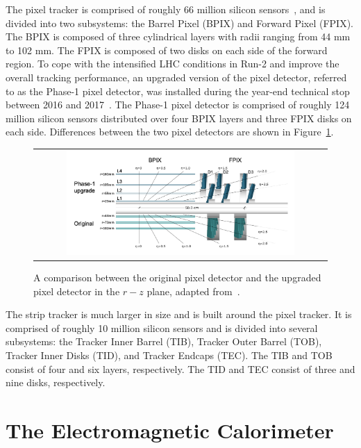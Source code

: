 The pixel tracker is comprised of roughly 66 million silicon sensors~\cite{CMS:2014pgm}, and is divided into two subsystems: the Barrel Pixel (BPIX) and  Forward Pixel (FPIX). The BPIX is composed of three cylindrical layers with radii ranging from 44 mm to 102 mm. The FPIX is composed of two disks on each side of the forward region. To cope with the intensified \ac{LHC} conditions in Run-2 and improve the overall tracking performance, an upgraded version of the pixel detector, referred to as the Phase-1 pixel detector, was installed during the year-end technical stop between 2016 and 2017~\cite{CMSTrackerGroup:2020edz}. The Phase-1 pixel detector is comprised of roughly 124 million silicon sensors distributed over four BPIX layers and three FPIX disks on each side. Differences between the two pixel detectors are shown in Figure~\ref{fig:Pixel}.

\begin{figure}[tbh!]
 \begin{center}
 \begin{tabular}{c}
 \includegraphics[width=0.8\textwidth]{figures/Part2/CMS/Pixel}
 \end{tabular}
 \caption{A comparison between the original pixel detector and the upgraded pixel detector in the $r-z$ plane, adapted from~\cite{CMSTrackerGroup:2020edz}.}
 \label{fig:Pixel}
 \end{center}
\end{figure}

The strip tracker is much larger in size and is built around the pixel tracker. It is comprised of roughly 10 million silicon sensors and is divided into several subsystems: the Tracker Inner Barrel (TIB), Tracker Outer Barrel (TOB), Tracker Inner Disks (TID), and Tracker Endcaps (TEC). The TIB and TOB consist of four and six layers, respectively. The TID and TEC consist of three and nine disks, respectively.

\section{The Electromagnetic Calorimeter}
\label{sec:ECAL}


